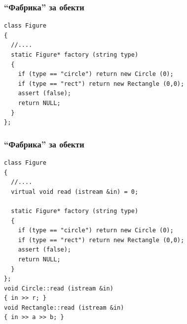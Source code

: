 \documentclass{beamer}
\begin{document}
\begin{frame}[fragile]
\frametitle{``Фабрика'' за обекти}


\begin{flushleft}
\begin{lstlisting}
class Figure
{
  //....
  static Figure* factory (string type)
  {
    if (type == "circle") return new Circle (0);
    if (type == "rect") return new Rectangle (0,0);
    assert (false);
    return NULL;
  }
};
\end{lstlisting}
\end{flushleft}


\end{frame}


\begin{frame}[fragile]
\frametitle{``Фабрика'' за обекти}


\begin{flushleft}
\begin{lstlisting}
class Figure
{
  //....
  virtual void read (istream &in) = 0;

  static Figure* factory (string type)
  {
    if (type == "circle") return new Circle (0);
    if (type == "rect") return new Rectangle (0,0);
    assert (false);
    return NULL;
  }
};
void Circle::read (istream &in)
{ in >> r; }
void Rectangle::read (istream &in)
{ in >> a >> b; }
\end{lstlisting}
\end{flushleft}


\end{frame}
\end{document}
